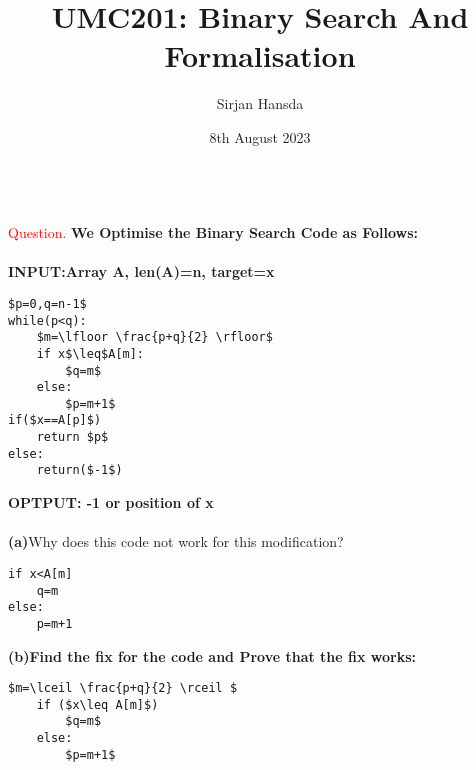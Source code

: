 \documentclass{article}
\title{UMC201: Binary Search And Formalisation}
\author{Sirjan Hansda}
\date{8th August 2023}
\begin{document}
\maketitle
\leavevmode
\\
\textcolor{red}{Question.} \textbf{We Optimise the Binary Search Code as Follows:} \\
\\
\textbf{INPUT:Array A, len(A)=n, target=x}
\begin{lstlisting}[mathescape=true]
$p=0,q=n-1$
while(p<q):
    $m=\lfloor \frac{p+q}{2} \rfloor$
    if x$\leq$A[m]:
        $q=m$
    else:
        $p=m+1$
if($x==A[p]$)
    return $p$
else:
    return($-1$)
\end{lstlisting}
\textbf{OPTPUT: -1 or position of x}
\\
\\
\textbf{(a)}Why does this code not work for this modification?
\begin{lstlisting}
if x<A[m]
    q=m
else:
    p=m+1

\end{lstlisting}
\leavevmode
\newline
\textbf{(b)Find the fix for the code and Prove that the fix works:}
\begin{lstlisting}[mathescape=true]
    $m=\lceil \frac{p+q}{2} \rceil $
    if ($x\leq A[m]$)
        $q=m$
    else:
        $p=m+1$
\end{lstlisting}
\end{document}
